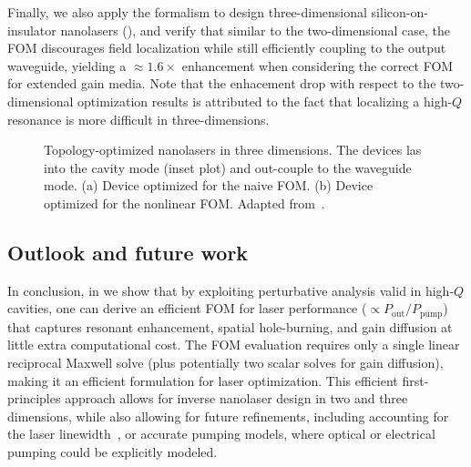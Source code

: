 Finally, we also apply the formalism to design three-dimensional silicon-on-insulator nanolasers (), 
and verify that similar to the two-dimensional case, the FOM discourages field localization while still efficiently coupling to the output waveguide, yielding a $\approx 1.6\times$
enhancement when considering the correct FOM for extended gain media. Note that the enhacement drop with respect to the two-dimensional optimization results
is attributed to the fact that localizing a high-$Q$ resonance is more difficult in three-dimensions.

\begin{figure}[tb]
    \centering
    \caption{Topology-optimized nanolasers in three dimensions. The devices las into the cavity mode (inset plot) and out-couple to the waveguide mode. (a) Device optimized for the naive FOM. (b) Device optimized for the nonlinear FOM.
    Adapted from~\cite{ownpub4}.}
    \label{fig:laser3d}
\end{figure}

\subsection*{Outlook and future work}

In conclusion, in \cite{ownpub4} we show that by exploiting perturbative analysis valid in high-$Q$ cavities, one can derive  
an efficient FOM for laser performance ($\propto P_\text{out}/P_\text{pump}$) that captures resonant enhancement,  
spatial hole-burning, and gain diffusion at little extra computational cost. The FOM evaluation requires only a  
single linear reciprocal Maxwell solve (plus potentially two scalar solves for gain diffusion), making it 
an efficient formulation for laser optimization. This efficient first-principles approach allows for inverse nanolaser design in two and three dimensions, while  
also allowing for future refinements, including accounting for the laser linewidth~\cite{pick}, or accurate pumping models, where optical or electrical pumping could be explicitly
modeled.

